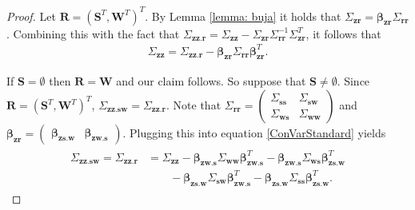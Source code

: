 \documentclass[11pt,a4paper]{article}
\theoremstyle{definition}
\theoremstyle{remark}
\begin{document}
\begin{proof}%
Let $\mathbf{R} = (\mathbf{S}^T,\mathbf{W}^T)^T$. By Lemma \ref{lemma: buja} it holds that
 $\Sigma_{\mathbf{zr}}=\boldsymbol{\beta}_{\mathbf{zr}}\Sigma_{\mathbf{rr}}$. Combining this with the fact that
$
    \Sigma_{\mathbf{zz}.\mathbf{r}} = \Sigma_{\mathbf{zz}} - \Sigma_{\mathbf{zr}} \Sigma^{-1}_{\mathbf{rr}} \Sigma^T_{\mathbf{zr}}$, it follows that 
 \begin{align}  
  \Sigma_{\mathbf{zz}} = \Sigma_{\mathbf{zz}.\mathbf{r}} - \boldsymbol{\beta}_{\mathbf{zr}} \Sigma_{\mathbf{rr}} \boldsymbol{\beta}^T_{\mathbf{zr}}.
    \label{ConVarStandard}
\end{align}

If $\mathbf{S}=\emptyset$ then $\mathbf{R}=\mathbf{W}$ and our claim follows. So suppose that $\mathbf{S}\neq \emptyset$. Since $\mathbf{R} = (\mathbf{S}^T,\mathbf{W}^T)^T$, $\Sigma_{\mathbf{zz}.\mathbf{sw}} = \Sigma_{\mathbf{zz}.\mathbf{r}}$. Note that 
$\Sigma_{\mathbf{rr}} = \begin{pmatrix} \Sigma_{\mathbf{ss}}& \Sigma_{\mathbf{sw}}\\\Sigma_{\mathbf{ws}}&\Sigma_{\mathbf{ww}}\end{pmatrix}  $ 
and
$ \boldsymbol{\beta}_{\mathbf{z}\mathbf{r}} = \begin{pmatrix} \boldsymbol{\beta}_{\mathbf{zs}.\mathbf{w}} & \boldsymbol{\beta}_{\mathbf{zw}.\mathbf{s}} \end{pmatrix}.$
Plugging this into equation \eqref{ConVarStandard} yields
\begin{align}
\begin{split}
\Sigma_{\mathbf{zz}.\mathbf{sw}} = 
\Sigma_{\mathbf{zz}.\mathbf{r}} &=
\Sigma_{\mathbf{zz}} - \boldsymbol{\beta}_{\mathbf{zw}.\mathbf{s}} \Sigma_{\mathbf{ww}} \boldsymbol{\beta}^{T}_{\mathbf{zw}.\mathbf{s}}
- \boldsymbol{\beta}_{\mathbf{zw}.\mathbf{s}} \Sigma_{\mathbf{ws}} \boldsymbol{\beta}^{T}_{\mathbf{zs}.\mathbf{w}}\\
&\quad \quad   - \boldsymbol{\beta}_{\mathbf{zs}.\mathbf{w}} \Sigma_{\mathbf{sw}} \boldsymbol{\beta}^{T}_{\mathbf{zw}.\mathbf{s}} 
-\boldsymbol{\beta}_{\mathbf{zs}.\mathbf{w}} \Sigma_{\mathbf{ss}} \boldsymbol{\beta}^{T}_{\mathbf{zs}.\mathbf{w}}. 
\end{split}
\label{eq:convar1}
\end{align}


\end{proof}
\end{document}
